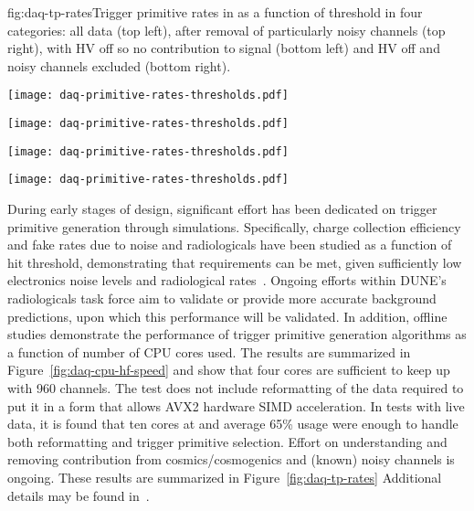 \begin{dunefigure}{fig:daq-tp-rates}{Trigger primitive rates in  as a function of threshold in four categories: all data (top left),  after removal of particularly noisy channels (top right), with HV off so no contribution to signal (bottom left) and HV off and noisy channels excluded (bottom right).}
  \begin{minipage}[b]{0.5\linewidth}
    \begin{center}
      \texttt{[image: daq-primitive-rates-thresholds.pdf]}

      \texttt{[image: daq-primitive-rates-thresholds.pdf]}
    \end{center}
  \end{minipage}%
  \begin{minipage}[b]{0.5\linewidth}
    \begin{center}
      \texttt{[image: daq-primitive-rates-thresholds.pdf]}

      \texttt{[image: daq-primitive-rates-thresholds.pdf]}
    \end{center}
  \end{minipage}

\end{dunefigure}


During early stages of design, significant effort has been dedicated on
trigger primitive generation through simulations.
Specifically, charge collection efficiency and fake rates due to noise
and radiologicals have been studied as a function of hit threshold,
demonstrating that requirements can be met, given sufficiently low
electronics noise levels and radiological rates~\cite{bib:docdb11236}. 
Ongoing efforts within DUNE's radiologicals task force aim to validate
or provide more accurate background predictions, upon which this
performance will be validated.
In addition, offline studies demonstrate the performance of trigger
primitive generation algorithms as a function of number of CPU cores
used.  
The results are summarized in Figure~\ref{fig:daq-cpu-hf-speed} and show
that four cores are sufficient to keep up with 960 channels.
The test does not include reformatting of the data required to put it in
a form that allows AVX2 hardware SIMD acceleration.
In tests with live  data, it is found that ten cores at
and average 65\% usage were enough to handle both reformatting and
trigger primitive selection. 
Effort on understanding and removing contribution
from cosmics/cosmogenics and (known) noisy channels is ongoing.
These results are summarized in Figure~\ref{fig:daq-tp-rates}
Additional details may be found in~.

